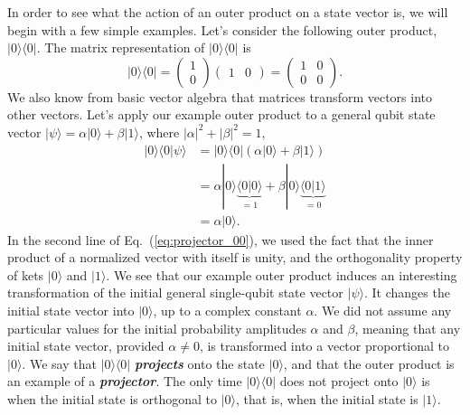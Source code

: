 In order to see what the action of an outer product on a state vector is, we will begin with a few simple examples.
Let's consider the following outer product, $|0\rangle\langle0|$.
The matrix representation of $|0\rangle\langle0|$ is
\begin{equation}
    |0\rangle\langle0| = \begin{pmatrix} 1 \\ 0 \end{pmatrix} \begin{pmatrix} 1 & 0 \end{pmatrix} = \begin{pmatrix} 1 & 0 \\ 0 & 0 \end{pmatrix}.
\end{equation}
We also know from basic vector algebra that matrices transform vectors into other vectors.
Let's apply our example outer product to a general qubit state vector $|\psi\rangle = \alpha|0\rangle + \beta|1\rangle$, where $|\alpha|^2+|\beta|^2=1$,
\begin{align}
    |0\rangle\langle0|\psi\rangle & = |0\rangle\langle0| \left( \alpha|0\rangle + \beta|1\rangle \right) \label{eq:projector_00}\\
    & = \alpha |0\rangle\underbrace{\langle0|0\rangle}_{=1} + \beta |0\rangle\underbrace{\langle0|1\rangle}_{=0} \nonumber\\
    & = \alpha|0\rangle. \nonumber
\end{align}
In the second line of Eq.~(\ref{eq:projector_00}), we used the fact that the inner product of a normalized vector with itself is unity, and the orthogonality property of kets $|0\rangle$ and $|1\rangle$.
We see that our example outer product induces an interesting transformation of the initial general single-qubit state vector $|\psi\rangle$.
It changes the initial state vector into $|0\rangle$, up to a complex constant $\alpha$.
We did not assume any particular values for the initial probability amplitudes $\alpha$ and $\beta$, meaning that any initial state vector, provided $\alpha\neq0$, is transformed into a vector proportional to $|0\rangle$.
We say that $|0\rangle\langle0|$ \textit{\textbf{projects}} onto the state $|0\rangle$, and that the outer product is an example of a \textbf{\emph{projector}}.
The only time $|0\rangle\langle0|$ does not project onto $|0\rangle$ is when the initial state is orthogonal to $|0\rangle$, that is, when the initial state is $|1\rangle$.

